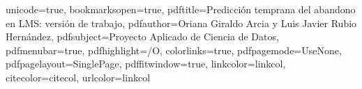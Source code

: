 \newenvironment{vcenterpage}
{\newpage\vspace*{\fill}\fancyhf{}\renewcommand{\headrulewidth}{0pt}}
{\vspace*{\fill}\par\pagebreak}
\usepackage{hyperref}
\hypersetup
{
unicode=true,
bookmarksopen=true,
pdftitle={Predicción temprana del abandono en LMS: versión de trabajo},
pdfauthor={Oriana Giraldo Arcia y Luis Javier Rubio Hernández}, 
pdfsubject={Proyecto Aplicado de Ciencia de Datos}, %
pdfmenubar=true, %
pdfhighlight=/O, %
colorlinks=true, %
pdfpagemode=UseNone, %
pdfpagelayout=SinglePage, %
pdffitwindow=true, %
linkcolor=linkcol, %
citecolor=citecol, %
urlcolor=linkcol %
}


